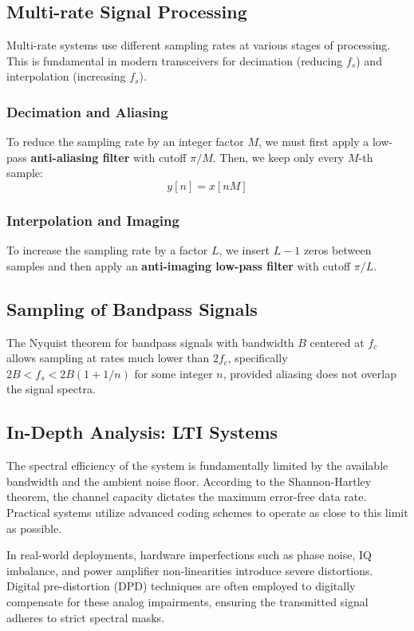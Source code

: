 \subsection{Multi-rate Signal Processing}
Multi-rate systems use different sampling rates at various stages of processing. This is fundamental in modern transceivers for decimation (reducing $f_s$) and interpolation (increasing $f_s$).

\subsubsection{Decimation and Aliasing}
To reduce the sampling rate by an integer factor $M$, we must first apply a low-pass \textbf{anti-aliasing filter} with cutoff $\pi/M$. Then, we keep only every $M$-th sample:
\begin{equation}
    y[n] = x[nM]
\end{equation}

\subsubsection{Interpolation and Imaging}
To increase the sampling rate by a factor $L$, we insert $L-1$ zeros between samples and then apply an \textbf{anti-imaging low-pass filter} with cutoff $\pi/L$.

\subsection{Sampling of Bandpass Signals}
The Nyquist theorem for bandpass signals with bandwidth $B$ centered at $f_c$ allows sampling at rates much lower than $2f_c$, specifically $2B < f_s < 2B(1 + 1/n)$ for some integer $n$, provided aliasing does not overlap the signal spectra.

\subsection{In-Depth Analysis: LTI Systems}
The spectral efficiency of the system is fundamentally limited by the available bandwidth and the ambient noise floor. According to the Shannon-Hartley theorem, the channel capacity dictates the maximum error-free data rate. Practical systems utilize advanced coding schemes to operate as close to this limit as possible.

In real-world deployments, hardware imperfections such as phase noise, IQ imbalance, and power amplifier non-linearities introduce severe distortions. Digital pre-distortion (DPD) techniques are often employed to digitally compensate for these analog impairments, ensuring the transmitted signal adheres to strict spectral masks.

